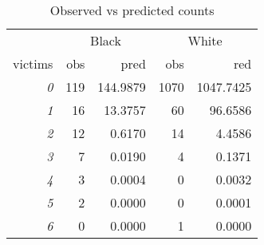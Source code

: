 \begin{table}[H]

\caption{\label{tab:obs_vs_pred}Observed vs predicted counts}
\centering
\begin{tabular}[t]{>{}r|r|r|r|r}
\hline
\multicolumn{1}{c|}{ } & \multicolumn{2}{c|}{Black} & \multicolumn{2}{c}{White} \\
\cline{2-3} \cline{4-5}
victims & obs & pred & obs & red\\
\hline
\hline
\em{0} & 119 & 144.9879 & 1070 & 1047.7425\\
\hline
\em{1} & 16 & 13.3757 & 60 & 96.6586\\
\hline
\em{2} & 12 & 0.6170 & 14 & 4.4586\\
\hline
\em{3} & 7 & 0.0190 & 4 & 0.1371\\
\hline
\em{4} & 3 & 0.0004 & 0 & 0.0032\\
\hline
\em{5} & 2 & 0.0000 & 0 & 0.0001\\
\hline
\em{6} & 0 & 0.0000 & 1 & 0.0000\\
\hline
\end{tabular}
\end{table}